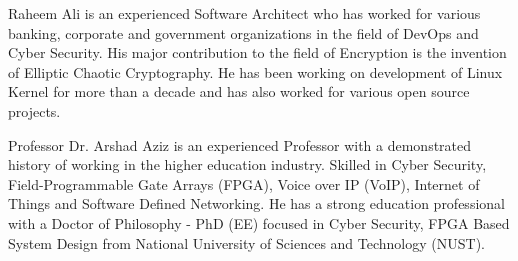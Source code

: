 \documentclass[lettersize,journal]{IEEEtran}
\begin{document}
\begin{IEEEbiography}{Raheem Ali} is an experienced Software Architect who has worked for various banking, corporate and government organizations in the field of DevOps and Cyber Security. His major contribution to the field of Encryption is the invention of Elliptic Chaotic Cryptography. He has been working on development of Linux Kernel for more than a decade and has also worked for various open source projects. 
\end{IEEEbiography}

\begin{IEEEbiography}{Professor Dr. Arshad Aziz} is an experienced Professor with a demonstrated history of working in the higher education industry. Skilled in Cyber Security, Field-Programmable Gate Arrays (FPGA), Voice over IP (VoIP), Internet of Things and Software Defined Networking. He has a strong education professional with a Doctor of Philosophy - PhD (EE) focused in Cyber Security, FPGA Based System Design from National University of Sciences and Technology (NUST).
\end{IEEEbiography}

\vfill
\end{document}

